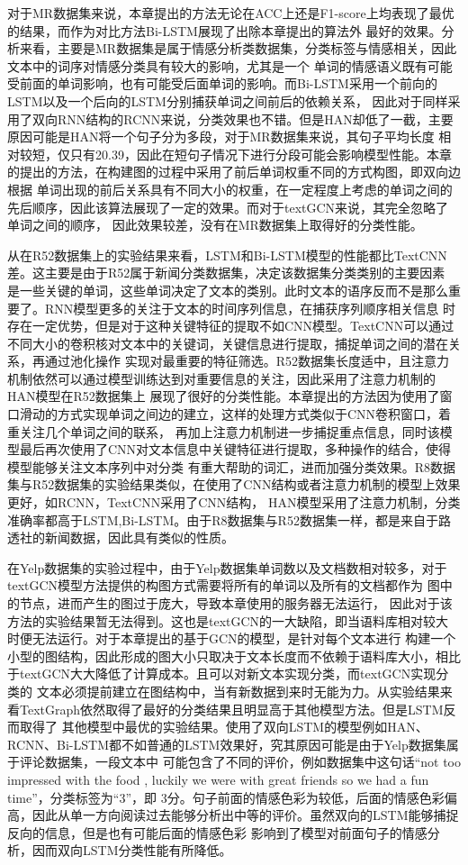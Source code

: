 对于MR数据集来说，本章提出的方法无论在ACC上还是F1-score上均表现了最优的结果，而作为对比方法Bi-LSTM展现了出除本章提出的算法外
最好的效果。分析来看，主要是MR数据集是属于情感分析类数据集，分类标签与情感相关，因此文本中的词序对情感分类具有较大的影响，尤其是一个
单词的情感语义既有可能受前面的单词影响，也有可能受后面单词的影响。而Bi-LSTM采用一个前向的LSTM以及一个后向的LSTM分别捕获单词之间前后的依赖关系，
因此对于同样采用了双向RNN结构的RCNN来说，分类效果也不错。但是HAN却低了一截，主要原因可能是HAN将一个句子分为多段，对于MR数据集来说，其句子平均长度
相对较短，仅只有20.39，因此在短句子情况下进行分段可能会影响模型性能。本章的提出的方法，在构建图的过程中采用了前后单词权重不同的方式构图，即双向边根据
单词出现的前后关系具有不同大小的权重，在一定程度上考虑的单词之间的先后顺序，因此该算法展现了一定的效果。而对于textGCN来说，其完全忽略了单词之间的顺序，
因此效果较差，没有在MR数据集上取得好的分类性能。

从在R52数据集上的实验结果来看，LSTM和Bi-LSTM模型的性能都比TextCNN差。这主要是由于R52属于新闻分类数据集，决定该数据集分类类别的主要因素
是一些关键的单词，这些单词决定了文本的类别。此时文本的语序反而不是那么重要了。RNN模型更多的关注于文本的时间序列信息，在捕获序列顺序相关信息
时存在一定优势，但是对于这种关键特征的提取不如CNN模型。TextCNN可以通过不同大小的卷积核对文本中的关键词，关键信息进行提取，捕捉单词之间的潜在关系，再通过池化操作
实现对最重要的特征筛选。R52数据集长度适中，且注意力机制依然可以通过模型训练达到对重要信息的关注，因此采用了注意力机制的HAN模型在R52数据集上
展现了很好的分类性能。本章提出的方法因为使用了窗口滑动的方式实现单词之间边的建立，这样的处理方式类似于CNN卷积窗口，着重关注几个单词之间的联系，
再加上注意力机制进一步捕捉重点信息，同时该模型最后再次使用了CNN对文本信息中关键特征进行提取，多种操作的结合，使得模型能够关注文本序列中对分类
有重大帮助的词汇，进而加强分类效果。R8数据集与R52数据集的实验结果类似，在使用了CNN结构或者注意力机制的模型上效果更好，如RCNN，TextCNN采用了CNN结构，
HAN模型采用了注意力机制，分类准确率都高于LSTM,Bi-LSTM。由于R8数据集与R52数据集一样，都是来自于路透社的新闻数据，因此具有类似的性质。

在Yelp数据集的实验过程中，由于Yelp数据集单词数以及文档数相对较多，对于textGCN模型方法提供的构图方式需要将所有的单词以及所有的文档都作为
图中的节点，进而产生的图过于庞大，导致本章使用的服务器无法运行，
因此对于该方法的实验结果暂无法得到。这也是textGCN的一大缺陷，即当语料库相对较大时便无法运行。对于本章提出的基于GCN的模型，是针对每个文本进行
构建一个小型的图结构，因此形成的图大小只取决于文本长度而不依赖于语料库大小，相比于textGCN大大降低了计算成本。且可以对新文本实现分类，而textGCN实现分类的
文本必须提前建立在图结构中，当有新数据到来时无能为力。从实验结果来看TextGraph依然取得了最好的分类结果且明显高于其他模型方法。但是LSTM反而取得了
其他模型中最优的实验结果。使用了双向LSTM的模型例如HAN、RCNN、Bi-LSTM都不如普通的LSTM效果好，究其原因可能是由于Yelp数据集属于评论数据集，一段文本中
可能包含了不同的评价，例如数据集中这句话“not too impressed with the food , luckily we were with great friends so we had a fun time”，分类标签为“3”，即
3分。句子前面的情感色彩为较低，后面的情感色彩偏高，因此从单一方向阅读过去能够分析出中等的评价。虽然双向的LSTM能够捕捉反向的信息，但是也有可能后面的情感色彩
影响到了模型对前面句子的情感分析，因而双向LSTM分类性能有所降低。

